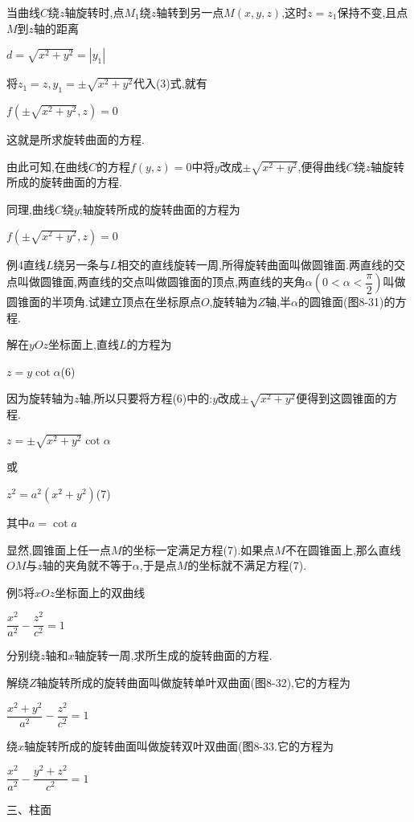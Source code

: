 \documentclass[oneside]{book}
\begin{document}
当曲线$C$绕$z$轴旋转时,点${M_1}$绕$z$轴转到另一点$M(x,y,z)$,这时$z = {z_1}$保持不变,且点$M$到$z$轴的距离

$d = \sqrt {{x^2} + {y^2}}  = |{y_1}|$

将${z_1} = z,{y_1} =  \pm \sqrt {{x^2} + {y^2}} $代入(3)式,就有

$f\left( { \pm \sqrt {{x^2} + {y^2}} ,z} \right) = 0$

这就是所求旋转曲面的方程.

由此可知,在曲线$C$的方程$f(y,z) = 0$中将$y$改成$ \pm \sqrt {{x^2} + {y^2}} $,便得曲线$C$绕$z$轴旋转所成的旋转曲面的方程.

同理,曲线$C$绕$y$;轴旋转所成的旋转曲面的方程为

$f( \pm \sqrt {{x^2} + {y^2}} ,z) = 0$

例4直线$L$绕另一条与$L$相交的直线旋转一周,所得旋转曲面叫做圆锥面.两直线的交点叫做圆锥面,两直线的交点叫做圆锥面的顶点,两直线的夹角$\alpha \left( {0 < \alpha  < \dfrac{\pi }{2}} \right)$叫做圆锥面的半项角.试建立顶点在坐标原点$O$,旋转轴为$Z$轴,半$\alpha$的圆锥面(图8-31)的方程.

解在$yOz$坐标面上,直线$L$的方程为

$z = y{{\cot}}\alpha $\quad (6)

因为旋转轴为$z$轴,所以只要将方程(6)中的:$y$改成$ \pm \sqrt {{x^2} + {y^2}} $便得到这圆锥面的方程.

$z =  \pm \sqrt {{x^2} + {y^2}} {{\cot }}\alpha $

或

${z^2} = {a^2}\left( {{x^2} + {y^2}} \right)$\quad(7)

其中$a = {{\cot}}a$

显然,圆锥面上任一点$M$的坐标一定满足方程(7).如果点$M$不在圆锥面上,那么直线$OM$与$z$轴的夹角就不等于$\alpha $,于是点$M$的坐标就不满足方程(7).

例5将$xOz$坐标面上的双曲线

$\dfrac{{{x^2}}}{{{a^2}}} - \dfrac{{{z^2}}}{{{c^2}}} = 1$

分别绕$z$轴和$x$轴旋转一周,求所生成的旋转曲面的方程.

解绕$Z$轴旋转所成的旋转曲面叫做旋转单叶双曲面(图8-32),它的方程为

$\dfrac{{{x^2} + {y^2}}}{{{a^2}}} - \dfrac{{{z^2}}}{{{c^2}}} = 1$

绕$x$轴旋转所成的旋转曲面叫做旋转双叶双曲面(图8-33.它的方程为

$\dfrac{{{x^2}}}{{{a^2}}} - \dfrac{{{y^2} + {z^2}}}{{{c^2}}} = 1$

三、柱面
\end{document}
